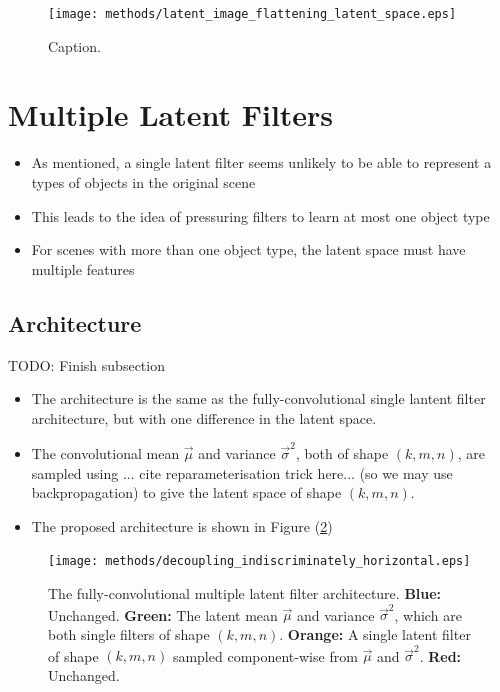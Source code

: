 \begin{figure}[H]
\centering
\captionsetup{justification=centering}
\texttt{[image: methods/latent\_image\_flattening\_latent\_space.eps]}
\caption{Caption.}
\label{fig:latent_image_flattening_latent_space}
\end{figure}


%
%
%
%
%
\section{Multiple Latent Filters}
\begin{itemize}
\item As mentioned, a single latent filter seems unlikely to be able to represent a types of objects in the original scene
\item This leads to the idea of pressuring filters to learn at most one object type
\item For scenes with more than one object type, the latent space must have multiple features
\end{itemize}
%
%
\subsection{Architecture}
TODO: Finish subsection

\begin{itemize}
\item The architecture is the same as the fully-convolutional single lantent filter architecture, but with one difference in the latent space.
\item The convolutional mean $\vec{\mu}$ and variance $\vec{\sigma}^2$, both of shape $(k, m, n)$, are sampled using ... cite reparameterisation trick here... (so we may use backpropagation) to give the latent space of shape $(k, m, n)$. 
\item The proposed architecture is shown in Figure (\ref{fig:decoupling_indiscriminately_horizontal})
\end{itemize}

\begin{figure}[h!]
\centering
\captionsetup{justification=centering}
\texttt{[image: methods/decoupling\_indiscriminately\_horizontal.eps]}
\caption{The fully-convolutional multiple latent filter architecture. \textbf{Blue:} Unchanged. \textbf{Green:} The latent mean $\vec{\mu}$ and variance $\vec{\sigma}^2$, which are both single filters of shape $(k, m, n)$. \textbf{Orange:} A single latent filter of shape $(k, m, n)$ sampled component-wise from $\vec{\mu}$ and $\vec{\sigma}^2$. \textbf{Red:} Unchanged.}
\label{fig:decoupling_indiscriminately_horizontal}
\end{figure}


